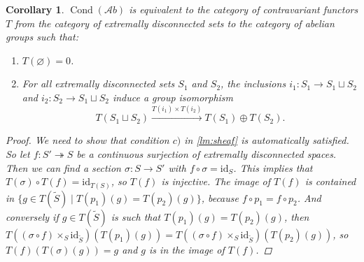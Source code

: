 \documentclass[11pt,A4]{article}
\theoremstyle{plain}
\newtheorem{cor}[thm]{Corollary}
\theoremstyle{definition}
\theoremstyle{remark}
\newcommand{\Ab}{\mathscr{A}b}
\DeclareMathOperator{\Cond}{Cond}
\newcommand{\op}{\oplus}
\newcommand{\fp}[1]{\times_{#1}}
\newcommand{\id}{\mathrm{id}}
\begin{document}
\begin{cor}\label{cor:sheaf}
    $\Cond(\Ab)$ is equivalent to the category of contravariant functors $T$ from the category of extremally disconnected sets to the category of abelian groups such that:
    \begin{enumerate}[label=\alph*)]
	\item $T(\varnothing)=0$.
	\item For all extremally disconnected sets $S_{1}$ and $S_{2}$, the inclusions $i_{1}\colon S_{1}\to S_{1}\sqcup S_{2}$ and $i_{2}\colon S_{2}\to S_{1}\sqcup S_{2}$ induce a group isomorphism
	    \[ T(S_{1}\sqcup S_{2})\xrightarrow{T(i_{1})\times T(i_{2})} T(S_{1})\op T(S_{2}).\]
    \end{enumerate}
    \begin{proof}
	We need to show that condition $c)$ in \cref{lm:sheaf} is automatically satisfied.
	So let $f\colon S'\twoheadrightarrow S$ be a continuous surjection of extremally disconnected spaces.
	Then we can find a section $\sigma\colon S\to S'$ with $f\circ \sigma =\id_{S}$.
	This implies that $T(\sigma)\circ T(f)=\id_{T(S)}$, so $T(f)$ is injective.
	The image of $T(f)$ is contained in $\{ g\in T(\tilde{S})\mid T(p_{1})(g)=T(p_{2})(g)\}$, because $f\circ p_{1}=f\circ p_{2}$.
	And conversely if $g\in T(\tilde{S})$ is such that $T(p_{1})(g)=T(p_{2})(g)$, then $T((\sigma \circ f)\fp{S}\id_{\tilde{S}})(T(p_{1})(g))=T((\sigma \circ f)\fp{S}\id_{\tilde{S}})(T(p_{2})(g))$, so $T(f)(T(\sigma)(g))=g$ and $g$ is in the image of $T(f)$.
    \end{proof}
\end{cor}
\end{document}
